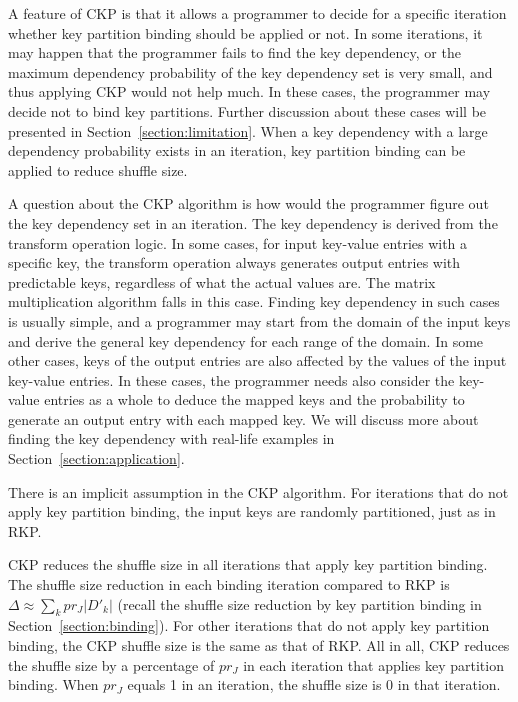 \documentclass[10pt,journal,compsoc]{IEEEtran}
\begin{document}
A feature of CKP is that it allows a programmer to decide for a specific
iteration whether key partition binding should be applied or not.
In some iterations, it may happen that the programmer fails to find the
key dependency,
or the maximum dependency probability of the key dependency set is very small, 
and thus applying CKP would not help much.    
In these cases, the programmer may decide not to bind key partitions. 
Further discussion about these cases will be presented in Section~\ref{section:limitation}.
When a key dependency with a large dependency probability exists in an
iteration, key partition binding can be applied to reduce shuffle size.

A question about the CKP algorithm is how would the programmer figure
out the key dependency set in an iteration.
The key dependency is derived from the transform operation logic. 
In some cases, for input key-value entries with a specific key, 
the transform operation always generates output entries with predictable keys, 
regardless of what the actual values are. 
The matrix multiplication algorithm falls in this case. 
Finding key dependency in such cases is usually simple, 
and a programmer may start from the domain of the input keys and 
derive the general key dependency for each range of the domain.
In some other cases, keys of the output entries are also affected by 
the values of the input key-value entries. 
In these cases, the programmer needs also consider the key-value entries as 
a whole to deduce the mapped keys and the probability
to generate an output entry with each mapped key.
We will discuss more about finding the key dependency with real-life examples in Section~\ref{section:application}.

There is an implicit assumption in the CKP algorithm. 
For iterations that do not apply key partition binding, 
the input keys are randomly partitioned, just as in RKP.

CKP reduces the shuffle size in all iterations that apply key partition binding.
The shuffle size reduction in each binding iteration compared to RKP is
$ \Delta \approx \sum_k pr_J |D'_k|$ (recall the shuffle size
reduction by key partition binding in Section~\ref{section:binding}).
For other iterations that do not apply key partition binding, 
the CKP shuffle size is the same as that of RKP.
All in all, CKP reduces the shuffle size by a percentage of $pr_J$ in each 
iteration that applies key partition binding. 
When $pr_J$ equals 1 in an iteration, the shuffle size is 0 in that iteration.
\end{document}

